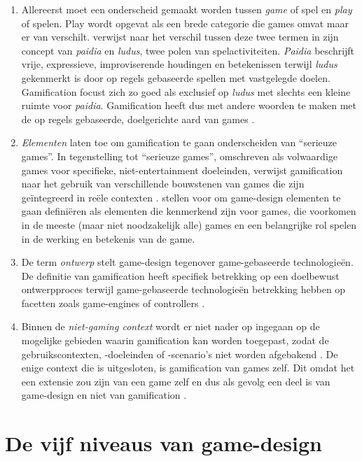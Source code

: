 \begin{enumerate}[label=(\arabic*)]
    \item Allereerst moet een onderscheid gemaakt worden tussen \textit{game} of spel en \textit{play} of spelen. Play wordt opgevat als een brede categorie die games omvat maar er van verschilt. \textcite{Caillois2001} verwijst naar het verschil tussen deze twee termen in zijn concept van \textit{paidia} en \textit{ludus}, twee polen van spelactiviteiten. \textit{Paidia} beschrijft vrije, expressieve, improviserende houdingen en betekenissen terwijl \textit{ludus} gekenmerkt is door op regels gebaseerde spellen met vastgelegde doelen. Gamification focust zich zo goed als exclusief op \textit{ludus} met slechts een kleine ruimte voor \textit{paidia}. Gamification heeft dus met andere woorden te maken met de op regels gebaseerde, doelgerichte aard van games \autocite{Sailer2016}.
    \item \textit{Elementen} laten toe om gamification te gaan onderscheiden van ``serieuze games''. In tegenstelling tot ``serieuze games'', omschreven als volwaardige games voor specifieke, niet-entertainment doeleinden, verwijst gamification naar het gebruik van verschillende bouwstenen van games die zijn geïntegreerd in reële contexten \autocite{Groh2012}. \textcite{Deterding20112} stellen voor om game-design elementen te gaan definiëren als elementen die kenmerkend zijn voor games, die voorkomen in de meeste (maar niet noodzakelijk alle) games en een belangrijke rol spelen in de werking en betekenis van de game.
    \item De term \textit{ontwerp} stelt game-design tegenover game-gebaseerde technologieën. De definitie van gamification heeft specifiek betrekking op een doelbewust ontwerpproces terwijl game-gebaseerde technologieën betrekking hebben op facetten zoals game-engines of controllers \autocite{Sailer2016}.
    \item Binnen de \textit{niet-gaming context} wordt er niet nader op ingegaan op de mogelijke gebieden waarin gamification kan worden toegepast, zodat de gebruikscontexten, -doeleinden of -scenario's niet worden afgebakend \autocite{Sailer2016}. De enige context die is uitgesloten, is gamification van games zelf. Dit omdat het een extensie zou zijn van een game zelf en dus als gevolg een deel is van game-design en niet van gamification \autocite{Groh2012}.
\end{enumerate}

\section{De vijf niveaus van game-design}

